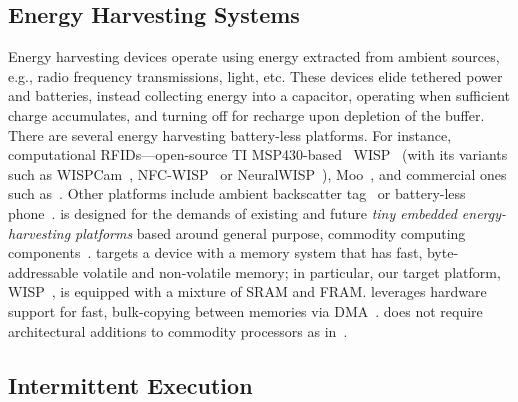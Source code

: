 \subsection{Energy Harvesting Systems}
\label{sec:background_harvesting}

Energy harvesting devices operate using energy extracted from ambient sources, e.g., radio frequency transmissions, light, etc. These devices elide tethered power and batteries, instead collecting energy into a capacitor, operating when sufficient charge accumulates, and turning off for recharge upon depletion of the buffer. There are several energy harvesting battery-less platforms. For instance, computational RFIDs---open-source TI MSP430-based~\cite{wolverine} WISP~\cite{wisp5} (with its variants such as WISPCam~\cite{naderiparizi_rfid_2015}, NFC-WISP~\cite{zhao_rfid_2015} or NeuralWISP~\cite{holleman_biocas_2008}), Moo~\cite{moo}, and commercial ones such as~\cite{medusa_farsens_2017}. Other platforms include ambient backscatter tag~\cite{liu_sigcomm_2013,parks_sigcomm_2014,majid2019multi} or battery-less phone~\cite{talla_imwut_2017}. 
%
\sys is designed for the demands of existing and future \emph{tiny embedded energy-harvesting platforms} based around general purpose, commodity computing components~\cite{wisp,msp430datasheet}. \sys targets a device with a memory system that has fast, byte-addressable volatile and non-volatile memory; in particular, our target platform, WISP~\cite{wisp}, is equipped with a mixture of SRAM and FRAM. \sys leverages hardware support for fast, bulk-copying between memories via DMA~\cite{msp430datasheet}. \sys does not require architectural additions to commodity processors as in~\cite{su_date_2017,hicks_isca_2017,quickrecall,nvp}.

\subsection{Intermittent Execution}
\label{sec:background_consistency}

